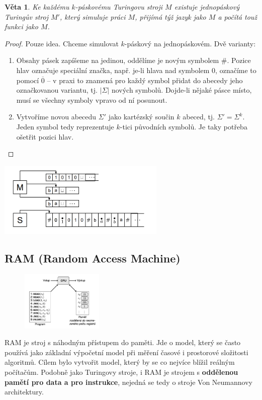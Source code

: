 \documentclass[11pt]{report} %
\newtheorem{theorem}{Věta}[section]
\numberwithin{equation}{section}
\begin{document}
\begin{theorem}
Ke každému $k$-páskovému Turingovu stroji $M$ existuje jednopáskový Turingův stroj $M'$, který simuluje práci $M$, přijímá týž jazyk jako $M$ a počítá touž funkci jako $M$.
\end{theorem}
\begin{proof}
	Pouze idea. Chceme simulovat $k$-páskový na jednopáskovém. Dvě varianty:
	\begin{enumerate}
		
		
		\item Obsahy pásek zapíšeme na jedinou, oddělíme je novým symbolem $\#$. Pozice hlav označuje speciální značka, např. je-li hlava nad symbolem $0$, označíme to pomocí $\overline{0}$ -- v praxi to znamená pro každý symbol přidat do abecedy jeho označkovanou variantu, tj. $|\Sigma|$ nových symbolů. Dojde-li nějaké pásce místo, musí se všechny symboly vpravo od ní posunout.
		
		\item Vytvoříme novou abecedu $\Sigma'$ jako kartézský součin $k$ abeced, tj. $\Sigma' = \Sigma^k$. Jeden symbol tedy reprezentuje $k$-tici původních symbolů. Je taky potřeba ošetřit pozici hlav.
	\end{enumerate}
\end{proof}

\includegraphics[width=0.6\textwidth]{img/turing_multi_seq.png}

\subsection{RAM (Random Access Machine)}
\begin{figure}
	\centering
	\includegraphics[width=0.35\textwidth]{img/ram.png}
\end{figure}
RAM je stroj s náhodným přístupem do paměti. Jde o model, který se často používá jako základní výpočetní model při měření časové i prostorové složitosti algoritmů. Cílem bylo vytvořit model, který by se co nejvíce blížil reálným počítačům. Podobně jako Turingovy stroje, i RAM je strojem s \textbf{oddělenou pamětí pro data a pro instrukce}, nejedná se tedy o stroje Von Neumannovy architektury. 
\end{document}
